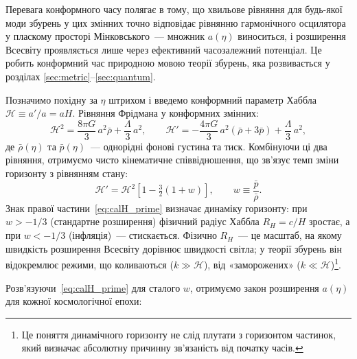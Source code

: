 \documentclass[12pt, a4paper]{article}
\begin{document}
\begin{keybox}
Перевага конформного часу полягає в тому, що хвильове
рівняння для будь-якої моди збурень у цих змінних точно
відповідає рівнянню гармонічного осцилятора у пласкому
просторі Мінковського~--- множник $a(\eta)$ виноситься,
і розширення Всесвіту проявляється лише через ефективний
часозалежний потенціал. Це робить конформний час природною
мовою теорії збурень, яка розвивається у розділах
\ref{sec:metric}–\ref{sec:quantum}.
\end{keybox}

Позначимо похідну за $\eta$ штрихом і введемо конформний
параметр Хаббла $\mathcal{H} \equiv a'/a = aH$. Рівняння
Фрідмана у конформних змінних:
\begin{equation*}
  \mathcal{H}^2 = \frac{8\pi G}{3}\,a^2\bar{\rho}
                + \frac{\Lambda}{3}\,a^2,
  \qquad
  \mathcal{H}' = -\frac{4\pi G}{3}\,a^2(\bar{\rho} + 3\bar{p})
               + \frac{\Lambda}{3}\,a^2,
\end{equation*}
де $\bar{\rho}(\eta)$ та $\bar{p}(\eta)$~--- однорідні фонові
густина та тиск. Комбінуючи ці два рівняння, отримуємо чисто
кінематичне співвідношення, що зв'язує темп зміни горизонту
з рівнянням стану:
\begin{equation}\label{eq:calH_prime}
  \mathcal{H}' = \mathcal{H}^2\!\left[1 - \tfrac{3}{2}(1+w)\right],
  \qquad w \equiv \frac{\bar{p}}{\bar{\rho}}.
\end{equation}
Знак правої частини~\eqref{eq:calH_prime} визначає динаміку
горизонту: при $w > -1/3$ (стандартне розширення) фізичний
радіус Хаббла $R_H = c/H$ зростає, а при $w < -1/3$
(інфляція)~--- стискається. Фізично $R_H$~--- це масштаб,
на якому швидкість розширення Всесвіту дорівнює швидкості
світла; у теорії збурень він відокремлює режими, що
коливаються ($k \gg \mathcal{H}$), від «заморожених»
($k \ll \mathcal{H}$)\footnote{Це поняття динамічного
горизонту не слід плутати з горизонтом частинок, який
визначає абсолютну причинну зв'язаність від початку часів.}.

Розв'язуючи~\eqref{eq:calH_prime} для сталого $w$, отримуємо
закон розширення $a(\eta)$ для кожної космологічної епохи:
\end{document}
